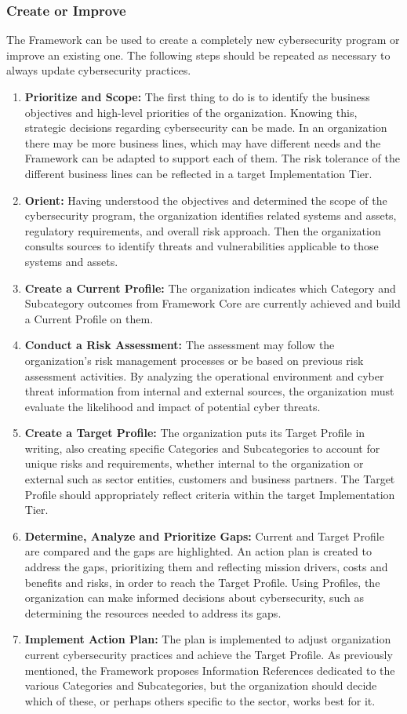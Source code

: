 \subsubsection{Create or Improve}
The Framework can be used to create a completely new cybersecurity program or improve an existing one. The following steps should be repeated as necessary to always update cybersecurity practices.
\begin{enumerate}
    \item \textbf{Prioritize and Scope:} The first thing to do is to identify the business objectives and high-level priorities of the organization. Knowing this, strategic decisions regarding cybersecurity can be made. In an organization there may be more business lines, which may have different needs and the Framework can be adapted to support each of them. The risk tolerance of the different business lines can be reflected in a target Implementation Tier.
    \item \textbf{Orient:} Having understood the objectives and determined the scope of the cybersecurity program, the organization identifies related systems and assets, regulatory requirements, and overall risk approach. Then the organization consults sources to identify threats and vulnerabilities applicable to those systems and assets.
    \item \textbf{Create a Current Profile:} The organization indicates which Category and Subcategory outcomes from Framework Core are currently achieved and build a Current Profile on them.
    \item \textbf{Conduct a Risk Assessment:} The assessment may follow the organization's risk management processes or be based on previous risk assessment activities. By analyzing the operational environment and cyber threat information from internal and external sources, the organization must evaluate the likelihood and impact of potential cyber threats.
    \item \textbf{Create a Target Profile:} The organization puts its Target Profile in writing, also creating specific Categories and Subcategories to account for unique risks and requirements, whether internal to the organization or external such as sector entities, customers and business partners. The Target Profile should appropriately reflect criteria within the target Implementation Tier.
    \item \textbf{Determine, Analyze and Prioritize Gaps:} Current and Target Profile are compared and the gaps are highlighted. An action plan is created to address the gaps, prioritizing them and reflecting mission drivers, costs and benefits and risks, in order to reach the Target Profile. Using Profiles, the organization can make informed decisions about cybersecurity, such as determining the resources needed to address its gaps.
    \item \textbf{Implement Action Plan:} The plan is implemented to adjust organization current cybersecurity practices and achieve the Target Profile. As previously mentioned, the Framework proposes Information References dedicated to the various Categories and Subcategories, but the organization should decide which of these, or perhaps others specific to the sector, works best for it.
\end{enumerate}
